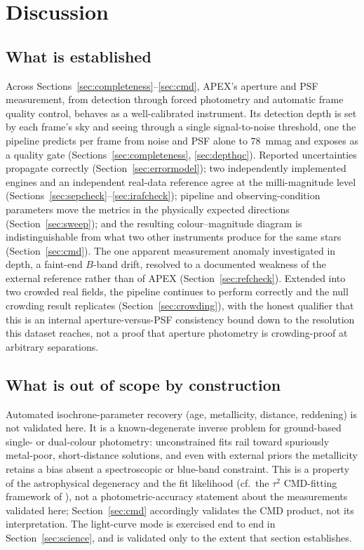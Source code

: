 \documentclass[fleqn,usenatbib]{mnras}
\begin{document}
\section{Discussion}
\label{sec:discussion}

\subsection{What is established}

Across Sections~\ref{sec:completeness}--\ref{sec:cmd}, APEX's aperture and PSF measurement, from detection through forced photometry and automatic frame quality control, behaves as a well-calibrated instrument. Its detection depth is set by each frame's sky and seeing through a single signal-to-noise threshold, one the pipeline predicts per frame from noise and PSF alone to $78$~mmag and exposes as a quality gate (Sections~\ref{sec:completeness}, \ref{sec:depthqc}). Reported uncertainties propagate correctly (Section~\ref{sec:errormodel}); two independently implemented engines and an independent real-data reference agree at the milli-magnitude level (Sections~\ref{sec:sepcheck}--\ref{sec:irafcheck}); pipeline and observing-condition parameters move the metrics in the physically expected directions (Section~\ref{sec:sweep}); and the resulting colour--magnitude diagram is indistinguishable from what two other instruments produce for the same stars (Section~\ref{sec:cmd}). The one apparent measurement anomaly investigated in depth, a faint-end $B$-band drift, resolved to a documented weakness of the external reference rather than of APEX (Section~\ref{sec:refcheck}). Extended into two crowded real fields, the pipeline continues to perform correctly and the null crowding result replicates (Section~\ref{sec:crowding}), with the honest qualifier that this is an internal aperture-versus-PSF consistency bound down to the resolution this dataset reaches, not a proof that aperture photometry is crowding-proof at arbitrary separations.

\subsection{What is out of scope by construction}
\label{sec:outofscope}

Automated isochrone-parameter recovery (age, metallicity, distance, reddening) is not validated here. It is a known-degenerate inverse problem for ground-based single- or dual-colour photometry: unconstrained fits rail toward spuriously metal-poor, short-distance solutions, and even with external priors the metallicity retains a bias absent a spectroscopic or blue-band constraint. This is a property of the astrophysical degeneracy and the fit likelihood (cf.\ the $\tau^2$ CMD-fitting framework of \citealt{naylor2006}), not a photometric-accuracy statement about the measurements validated here; Section~\ref{sec:cmd} accordingly validates the CMD product, not its interpretation. The light-curve mode is exercised end to end in Section~\ref{sec:science}, and is validated only to the extent that section establishes.
\end{document}
